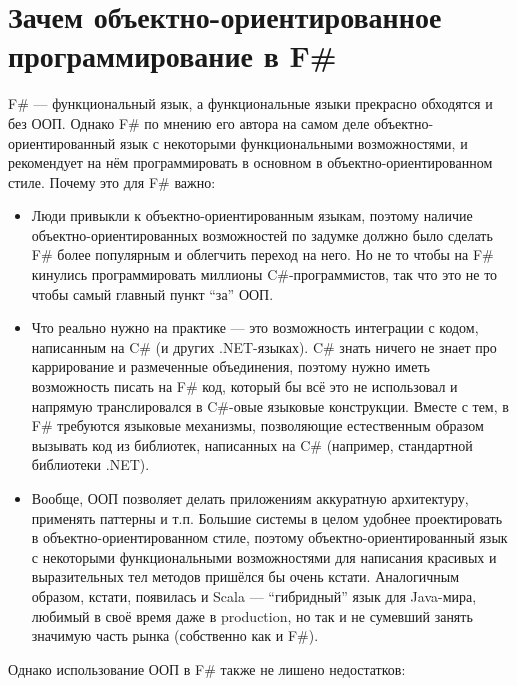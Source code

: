 \documentclass{../../text-style}
\begin{document}
\maketitle
\thispagestyle{empty}

\section{Зачем объектно-ориентированное программирование в F\#}

F\# --- функциональный язык, а функциональные языки прекрасно обходятся и без ООП.
Однако F\# по мнению его автора на самом деле объектно-ориентированный язык с некоторыми функциональными возможностями, и рекомендует на нём программировать в основном в объектно-ориентированном стиле.
Почему это для F\# важно:

\begin{itemize}
    \item Люди привыкли к объектно-ориентированным языкам, поэтому наличие объектно-ориентированных возможностей по задумке должно было сделать F\# более популярным и облегчить переход на него.
        Но не то чтобы на F\# кинулись программировать миллионы C\#-программистов, так что это не то чтобы самый главный пункт \enquote{за} ООП.
    \item Что реально нужно на практике --- это возможность интеграции с кодом, написанным на C\# (и других .NET-языках).
        C\# знать ничего не знает про каррирование и размеченные объединения, поэтому нужно иметь возможность писать на F\# код, который бы всё это не использовал и напрямую транслировался в C\#-овые языковые конструкции.
        Вместе с тем, в F\# требуются языковые механизмы, позволяющие естественным образом вызывать код из библиотек, написанных на C\# (например, стандартной библиотеки .NET).
    \item Вообще, ООП позволяет делать приложениям аккуратную архитектуру, применять паттерны и т.п.
        Большие системы в целом удобнее проектировать в объектно-ориентированном стиле, поэтому объектно-ориентированный язык с некоторыми функциональными возможностями для написания красивых и выразительных тел методов пришёлся бы очень кстати.
        Аналогичным образом, кстати, появилась и Scala --- \enquote{гибридный} язык для Java-мира, любимый в своё время даже в production, но так и не сумевший занять значимую часть рынка (собственно как и F\#).
\end{itemize}

Однако использование ООП в F\# также не лишено недостатков:
\end{document}
